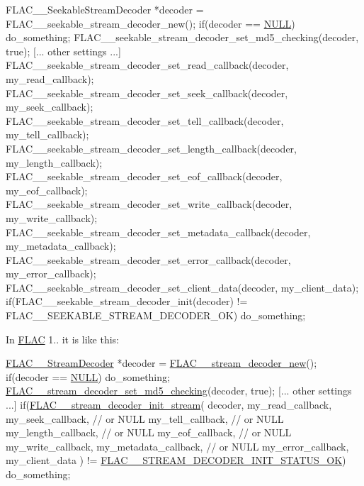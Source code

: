 \begin{DoxyCode}
FLAC\_\_SeekableStreamDecoder *decoder = FLAC\_\_seekable\_stream\_decoder\_new();
\textcolor{keywordflow}{if}(decoder == \hyperlink{getopt1_8c_a070d2ce7b6bb7e5c05602aa8c308d0c4}{NULL}) do\_something;
FLAC\_\_seekable\_stream\_decoder\_set\_md5\_checking(decoder, \textcolor{keyword}{true});
[... other settings ...]
FLAC\_\_seekable\_stream\_decoder\_set\_read\_callback(decoder, my\_read\_callback);
FLAC\_\_seekable\_stream\_decoder\_set\_seek\_callback(decoder, my\_seek\_callback);
FLAC\_\_seekable\_stream\_decoder\_set\_tell\_callback(decoder, my\_tell\_callback);
FLAC\_\_seekable\_stream\_decoder\_set\_length\_callback(decoder, my\_length\_callback);
FLAC\_\_seekable\_stream\_decoder\_set\_eof\_callback(decoder, my\_eof\_callback);
FLAC\_\_seekable\_stream\_decoder\_set\_write\_callback(decoder, my\_write\_callback);
FLAC\_\_seekable\_stream\_decoder\_set\_metadata\_callback(decoder, my\_metadata\_callback);
FLAC\_\_seekable\_stream\_decoder\_set\_error\_callback(decoder, my\_error\_callback);
FLAC\_\_seekable\_stream\_decoder\_set\_client\_data(decoder, my\_client\_data);
\textcolor{keywordflow}{if}(FLAC\_\_seekable\_stream\_decoder\_init(decoder) != FLAC\_\_SEEKABLE\_STREAM\_DECODER\_OK) do\_something;
\end{DoxyCode}


In \hyperlink{namespace_f_l_a_c}{F\+L\+AC} 1.. it is like this\+:


\begin{DoxyCode}
\hyperlink{struct_f_l_a_c_____stream_decoder}{FLAC\_\_StreamDecoder} *decoder = \hyperlink{group__flac__stream__decoder_ga7159eefc074dfbab4a37462f69326091}{FLAC\_\_stream\_decoder\_new}();
\textcolor{keywordflow}{if}(decoder == \hyperlink{getopt1_8c_a070d2ce7b6bb7e5c05602aa8c308d0c4}{NULL}) do\_something;
\hyperlink{group__flac__stream__decoder_ga48074d18a17ea88e8272cc8f865ae6e6}{FLAC\_\_stream\_decoder\_set\_md5\_checking}(decoder, \textcolor{keyword}{true});
[... other settings ...]
\textcolor{keywordflow}{if}(\hyperlink{group__flac__stream__decoder_ga32c28a56a2bdfa2333edbd3d991894d7}{FLAC\_\_stream\_decoder\_init\_stream}(
  decoder,
  my\_read\_callback,
  my\_seek\_callback,      \textcolor{comment}{// or NULL}
  my\_tell\_callback,      \textcolor{comment}{// or NULL}
  my\_length\_callback,    \textcolor{comment}{// or NULL}
  my\_eof\_callback,       \textcolor{comment}{// or NULL}
  my\_write\_callback,
  my\_metadata\_callback,  \textcolor{comment}{// or NULL}
  my\_error\_callback,
  my\_client\_data
) != \hyperlink{group__flac__stream__decoder_ggaaed54a24ac6310d29c5cafba79759c44ac94c7e9396f30642f34805e5d626e011}{FLAC\_\_STREAM\_DECODER\_INIT\_STATUS\_OK}) do\_something;
\end{DoxyCode}


